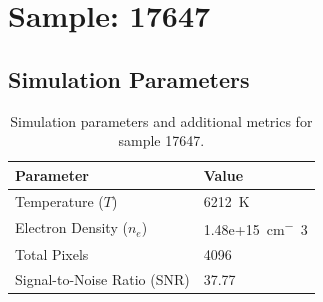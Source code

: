 \documentclass[a4paper,11pt]{article}
\begin{document}
\clearpage

\section{Sample: 17647}
\subsection{Simulation Parameters}
\begin{table}[h!]
    \centering
    \begin{tabular}{ll}
        \toprule
        \textbf{Parameter} & \textbf{Value} \\
        \midrule
        Temperature ($T$) & 6212 \,\si{K} \\
        Electron Density ($n_e$) & 1.48e+15 \,\si{cm^-3} \\
        Total Pixels & 4096 \\
        Signal-to-Noise Ratio (SNR) & 37.77 \\
        \bottomrule
    \end{tabular}
    \caption{Simulation parameters and additional metrics for sample 17647.}
    \label{tab:params_17647}
\end{table}
\end{document}

